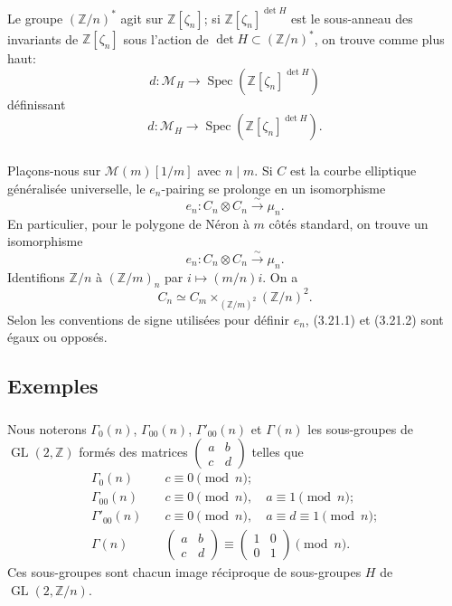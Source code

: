 \documentclass[11pt,a4paper]{amsart}
\theoremstyle{plain}
\theoremstyle{definition}
\DeclareMathOperator{\Spec}{Spec}
\DeclareMathOperator{\Gl}{GL}
\newcommand{\CM}{\mathcal{M}}
\newcommand{\mll}{\mathcal{M}}
\newcommand{\ZZ}{\mathbb{Z}}
\begin{document}
Le groupe $(\ZZ/n)^*$ agit sur $\ZZ[\zeta_n]$; si $\ZZ[\zeta_n]^{\det H}$ est le sous-anneau des invariants de $\ZZ[\zeta_n]$ sous l'action de $\det H \subset (\ZZ/n)^*$, on trouve comme plus haut:
\begin{equation}\label{eq:3.20.4}
d \colon \CM_H \longrightarrow \Spec(\ZZ[\zeta_n]^{\det H})
\end{equation}
d\'efinissant
\[
d \colon \CM_H \longrightarrow \Spec(\ZZ[\zeta_n]^{\det H}).
\]

\subsubsection{}
Pla\c{c}ons-nous sur $\mll(m)[1/m]$ avec $n \mid m$. Si $C$ est la courbe elliptique g\'en\'eralis\'ee universelle, le $e_n$-pairing se prolonge en un isomorphisme
\[
e_n \colon C_n \otimes C_n \xrightarrow{\sim} \mu_n.
\]
En particulier, pour le polygone de N\'eron \`a $m$ c\^ot\'es standard, on trouve un isomorphisme
\begin{equation}\label{eq:3.21.1}
e_n \colon C_n \otimes C_n \xrightarrow{\sim} \mu_n.
\end{equation}
Identifions $\ZZ/n$ \`a $(\ZZ/m)_n$ par $i \mapsto (m/n)i$. On a
\begin{equation}\label{eq:3.21.2}
C_n \simeq C_m \times_{(\ZZ/m)^2} (\ZZ/n)^2.
\end{equation}
Selon les conventions de signe utilis\'ees pour d\'efinir $e_n$, (3.21.1) et (3.21.2) sont \'egaux ou oppos\'es.


\subsection{Exemples}

\subsubsection{}
Nous noterons $\Gamma_0(n)$, $\Gamma_{00}(n)$, $\Gamma'_{00}(n)$ et $\Gamma(n)$ les sous-groupes de $\Gl(2, \ZZ)$ form\'es des matrices $\begin{pmatrix} a & b \\ c & d \end{pmatrix}$ telles que
\begin{align*}
\Gamma_0(n) & \quad c \equiv 0 \pmod n; \\
\Gamma_{00}(n) & \quad c \equiv 0 \pmod n, \quad a \equiv 1 \pmod n; \\
\Gamma'_{00}(n) & \quad c \equiv 0 \pmod n, \quad a \equiv d \equiv 1 \pmod n; \\
\Gamma(n) & \quad \begin{pmatrix} a & b \\ c & d \end{pmatrix} \equiv \begin{pmatrix} 1 & 0 \\ 0 & 1 \end{pmatrix} \pmod n.
\end{align*}
Ces sous-groupes sont chacun image r\'eciproque de sous-groupes $H$ de $\Gl(2, \ZZ/n)$.
\end{document}
